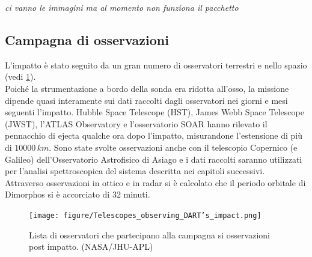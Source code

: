 \documentclass[a4paper,11pt,openright]{book}
\begin{document}
{\footnotesize\textit{ci vanno le immagini ma al momento non funziona il pacchetto}}

\subsection{Campagna di osservazioni}
L'impatto è stato seguito da un gran numero di osservatori terrestri e nello spazio (vedi \cref{fig:obs_dart}).\\
Poiché la strumentazione a bordo della sonda era ridotta all'osso, la missione dipende quasi interamente sui dati raccolti dagli osservatori nei giorni e mesi seguenti l'impatto.
Hubble Space Telescope (HST), James Webb Space Telescope (JWST), l'ATLAS Observatory e l'osservatorio SOAR hanno rilevato il pennacchio di ejecta qualche ora dopo l'impatto, misurandone l'estensione di più di $10000\,km$. Sono state svolte osservazioni anche con il telescopio Copernico (e Galileo) dell'Osservatorio Astrofisico di Asiago e i dati raccolti saranno utilizzati per l'analisi spettroscopica del sistema descritta nei capitoli successivi.\\
Attraverso osservazioni in ottico e in radar si è calcolato che il periodo orbitale di Dimorphos si è accorciato di 32 minuti.

\begin{figure}[h]
    \centering
    \texttt{[image: figure/Telescopes\_observing\_DART's\_impact.png]}
    \caption[Osservatori che hanno osservato l'impatto di DART.]{Lista di osservatori che partecipano alla campagna si osservazioni post impatto. (NASA/JHU-APL)}
    \label{fig:obs_dart}
\end{figure}
\end{document}
